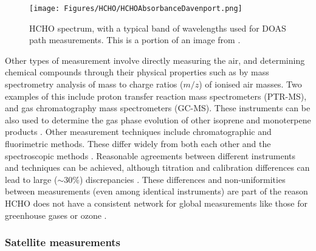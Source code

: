     \begin{figure}
      \texttt{[image: Figures/HCHO/HCHOAbsorbanceDavenport.png]}
      \caption{ %
        HCHO spectrum, with a typical band of wavelengths used for DOAS path measurements.
        This is a portion of an image from \textcite{Davenport2015}.}
      \label{LR:HCHO:Measurements:fig_HCHOSpectrum}
    \end{figure}
    
    
    Other types of measurement involve directly measuring the air, and determining chemical compounds through their physical properties such as by mass spectrometry analysis of mass to charge ratios ($m/z$) of ionised air masses.
    Two examples of this include proton transfer reaction mass spectrometers (PTR-MS), and gas chromatography mass spectrometers (GC-MS).
    These instruments can be also used to determine the gas phase evolution of other isoprene and monoterpene products \parencite[eg.][]{Lee2006a,Nguyen2014,Wolfe2016,Lerner2017}.
    Other measurement techniques include chromatographic and fluorimetric methods.
    These differ widely from both each other and the spectroscopic methods \parencite{Hak2005}.
    Reasonable agreements between different instruments and techniques can be achieved, although titration and calibration differences can lead to large ($\sim 30\%$) discrepancies \parencite[e.g.][]{Hak2005}.
    These differences and non-uniformities between measurements (even among identical instruments) are part of the reason HCHO does not have a consistent network for global measurements like those for greenhouse gases or ozone \parencite{FortemsCheiney2012}.
  
    \subsubsection{Satellite measurements}
      \label{LR:HCHO:Sat}
      
